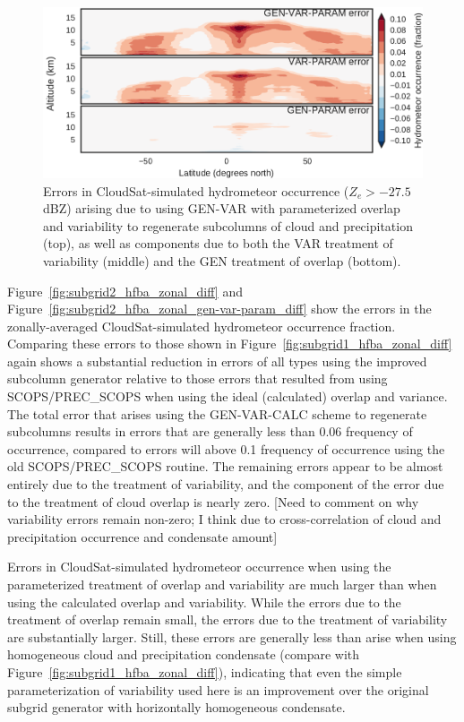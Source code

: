 \begin{figure}[htbp]
\centering
\includegraphics{graphics/subgrid2_hfba_zonal_gen-var-param_diff.pdf}
\caption{\label{fig:subgrid2_hfba_zonal_gen-var-param_diff}Errors in
CloudSat-simulated hydrometeor occurrence (\(Z_e > -27.5\) dBZ) arising
due to using GEN-VAR with parameterized overlap and variability to
regenerate subcolumns of cloud and precipitation (top), as well as
components due to both the VAR treatment of variability (middle) and the
GEN treatment of overlap
(bottom).}\label{fig:subgrid2ux5fhfbaux5fzonalux5fgen-var-paramux5fdiff}
\end{figure}

Figure~\ref{fig:subgrid2_hfba_zonal_diff} and
Figure~\ref{fig:subgrid2_hfba_zonal_gen-var-param_diff} show the errors
in the zonally-averaged CloudSat-simulated hydrometeor occurrence
fraction. Comparing these errors to those shown in
Figure~\ref{fig:subgrid1_hfba_zonal_diff} again shows a substantial
reduction in errors of all types using the improved subcolumn generator
relative to those errors that resulted from using SCOPS/PREC\_SCOPS when
using the ideal (calculated) overlap and variance. The total error that
arises using the GEN-VAR-CALC scheme to regenerate subcolumns results in
errors that are generally less than 0.06 frequency of occurrence,
compared to errors will above 0.1 frequency of occurrence using the old
SCOPS/PREC\_SCOPS routine. The remaining errors appear to be almost
entirely due to the treatment of variability, and the component of the
error due to the treatment of cloud overlap is nearly zero. {[}Need to
comment on why variability errors remain non-zero; I think due to
cross-correlation of cloud and precipitation occurrence and condensate
amount{]}

Errors in CloudSat-simulated hydrometeor occurrence when using the
parameterized treatment of overlap and variability are much larger than
when using the calculated overlap and variability. While the errors due
to the treatment of overlap remain small, the errors due to the
treatment of variability are substantially larger. Still, these errors
are generally less than arise when using homogeneous cloud and
precipitation condensate (compare with
Figure~\ref{fig:subgrid1_hfba_zonal_diff}), indicating that even the
simple parameterization of variability used here is an improvement over
the original subgrid generator with horizontally homogeneous condensate.

